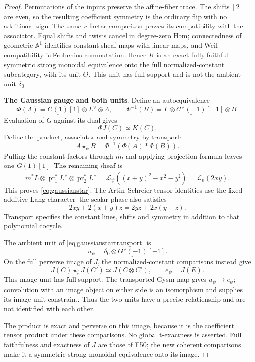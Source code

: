 \documentclass[11pt,a4paper]{article}
\newcommand{\A}{\mathbb A}\newcommand{\PP}{\mathbb P}\newcommand{\GL}{\mathrm{GL}}
\newcommand{\fid}[1]{\textsf{#1}}\newcommand{\gate}[1]{\textsf{#1}}
\theoremstyle{named}\newtheorem{finding}{Finding}[section]
\theoremstyle{definition}\newtheorem{definition}[finding]{Definition}
\theoremstyle{remark}\newtheorem{remark}[finding]{Remark}
\begin{document}
\begin{proof}
Permutations of the inputs preserve the affine-fiber trace.
The shifts $[2]$ are even, so the resulting coefficient
symmetry is the ordinary flip with no additional sign.
The same $r$-factor comparison proves its compatibility
with the associator.
Equal shifts and twists cancel in degree-zero Hom;
connectedness of geometric $\A^1$ identifies constant-sheaf
maps with linear maps, and Weil compatibility is Frobenius
commutation.
Hence $K$ is an exact fully faithful symmetric strong
monoidal equivalence onto the full normalized-constant
subcategory, with its unit $\Theta$.
This unit has full support and is not the ambient unit
$\delta_0$.

\par\smallskip\noindent\textbf{The Gaussian gauge and both units.}\quad
Define an autoequivalence
\[
 \Phi(A)=\underline{G(1)}[1]\otimes L^\vee\otimes A,
 \qquad
 \Phi^{-1}(B)=L\otimes\underline{G^\vee(-1)}[-1]\otimes B.
\]
Evaluation of $G$ against its dual gives
\[
 \Phi J(C)\simeq K(C).
\]
Define the product, associator and symmetry by transport:
\begin{equation}\label{eq:gaussianstartransport}
 A\star_\psi B=\Phi^{-1}(\Phi(A)*\Phi(B)).
\end{equation}
Pulling the constant factors through $m_!$ and applying
projection formula leaves one $\underline{G(1)}[1]$.
The remaining sheaf is
\[
 m^*L\otimes\operatorname{pr}_1^*L^\vee
          \otimes\operatorname{pr}_2^*L^\vee
 =\mathcal L_\psi((x+y)^2-x^2-y^2)
 =\mathcal L_\psi(2xy).
\]
This proves \eqref{eq:gaussianstar}.
The Artin--Schreier tensor identities use the fixed
additive Lang character; the scalar phase also satisfies
\[
 2xy+2(x+y)z=2yz+2x(y+z).
\]
Transport specifies the constant lines, shifts and symmetry
in addition to that polynomial cocycle.

The ambient unit of \eqref{eq:gaussianstartransport} is
\[
 u_\psi=\delta_0\otimes\underline{G^\vee(-1)}[-1].
\]
On the full perverse image of $J$, the normalized-constant
comparisons instead give
\[
 J(C)\star_\psi J(C')\simeq J(C\otimes C'),
 \qquad e_\psi=J(E).
\]
This image unit has full support. The transported Gysin
map gives $u_\psi\to e_\psi$; convolution with an image
object on either side is an isomorphism and supplies
its image unit constraint.
Thus the two units have a precise relationship and are
not identified with each other.

The product is exact and perverse on this image, because
it is the coefficient tensor product under these
comparisons. No global t-exactness is asserted.
Full faithfulness and exactness of $J$ are those of
\fid{F50}; the new coherent comparisons make it a
symmetric strong monoidal equivalence onto its image.


\end{proof}
\end{document}
